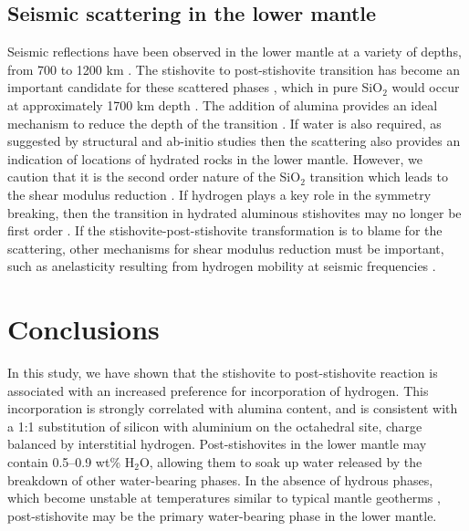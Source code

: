\documentclass[review]{elsarticle}
\begin{document}
\subsection{Seismic scattering in the lower mantle}
Seismic reflections have been observed in the lower mantle at a variety of depths, from 700 to 1200 km \citep[e.g.][]{DAD2013}. The stishovite to post-stishovite transition has become an important candidate for these scattered phases \citep{BSBIWJ2010,AHOHOM2013,BR2014}, which in pure SiO$_2$ would occur at approximately 1700 km depth \citep{HTSO2005,Nomuraetal2010}. The addition of alumina provides an ideal mechanism to reduce the depth of the transition \citep{Lakshtanovetal2007}. If water is also required, as suggested by structural and ab-initio studies \citep{SSP1995,PS2004,UKHRW2015} then the scattering also provides an indication of locations of hydrated rocks in the lower mantle. However, we caution that it is the second order nature of the SiO$_2$ transition which leads to the shear modulus reduction \citep{CHM2000}. If hydrogen plays a key role in the symmetry breaking, then the transition in hydrated aluminous stishovites may no longer be first order \cite{UKHRW2015}. If the stishovite-post-stishovite transformation is to blame for the scattering, other mechanisms for shear modulus reduction must be important, such as anelasticity resulting from hydrogen mobility at seismic frequencies \citep[termed Snoek relaxation;][]{Snoek1941, NB1972, MCDBT2007, UKHRW2015}.




\section{Conclusions}
In this study, we have shown that the stishovite to post-stishovite reaction is associated with an increased preference for incorporation of hydrogen. This incorporation is strongly correlated with alumina content, and is consistent with a 1:1 substitution of silicon with aluminium on the octahedral site, charge balanced by interstitial hydrogen. Post-stishovites in the lower mantle may contain 0.5--0.9 wt\% H$_2$O, allowing them to soak up water released by the breakdown of other water-bearing phases. In the absence of hydrous phases, which become unstable at temperatures similar to typical mantle geotherms \citep{Walteretal2015}, post-stishovite may be the primary water-bearing phase in the lower mantle.
\end{document}
